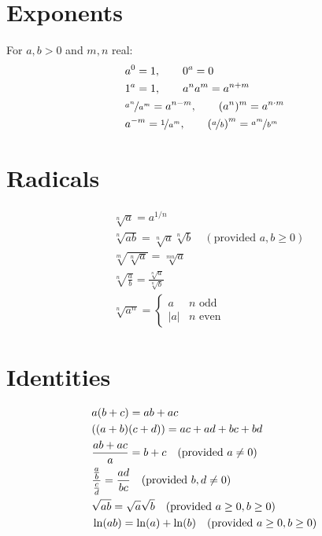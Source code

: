 \documentclass[letterpaper,landscape,9pt,fleqn]{extarticle}
\DeclarePairedDelimiter{\parens}{\lparen}{\rparen}
\begin{document}
\begin{multicols*}{3}
\section*{Exponents}
\vspace{-0.15in}
\begin{minipage}[c]{0.3333333333333\textwidth}
For \(a,b > 0\) and \(m,n\) real:
\begin{alignat*}{1}
&a^0 = 1,  \quad \quad 0^a = 0\\
&1^a = 1, \quad \quad  a^n a^m = a^{n+m}  \\
&\nicefrac{a^n}{a^m} = a^{n-m}, \quad \quad (a^n)^m = a^{n \cdot m} \\
&a^{-m} = \nicefrac{1}{a^m}, \quad \quad \left(\nicefrac{a}{b}\right)^m = \nicefrac{a^m}{b^m} 
\end{alignat*}
\end{minipage}

\section*{Radicals}
\begin{minipage}[c]{0.3333333333333\textwidth}
\begin{alignat*}{1}
&\sqrt[n]{a} = a^{1/n} \\
&\sqrt[n]{ab} = \sqrt[n]{a} \sqrt[n]{b}  \quad (\mbox{provided } a,b \geq 0) \\
&\sqrt[m]{\sqrt[n]{a}} = \sqrt[mn]{a} \\
&\sqrt[n]{\frac{a}{b}} = \frac{\sqrt[n]{a}}{\sqrt[n]{b}} \\
&\sqrt[n]{a^n} = \begin{cases} a & n \mbox{ odd} \\  |a| &  n \mbox{ even} \end{cases}
\end{alignat*}
\end{minipage}

\section*{Identities}
\begin{minipage}[c]{0.3333333333333\textwidth}
\begin{alignat*}{2}
   &a  \parens*{b + c} = a b + a c \\
   &\parens*{\parens{a +b}  \parens*{c + d}} = a c + a d + b c + bd \\
   &\frac{a b + ac}{a} = b + c  \quad (\mbox{provided } a \neq 0) \\
   &\frac{\frac{a}{b}}{\frac{c}{d}} = \frac{ad}{b c}  \quad (\mbox{provided } b,d \neq 0) \\
   &\sqrt{a b} = \sqrt{a}\sqrt{b}  \quad (\mbox{provided } a \geq 0, b \geq 0 ) \\
   &\ln(ab) = \ln(a) + \ln(b) \quad (\mbox{provided } a \geq 0, b \geq 0 ) \\
\end{alignat*}
\end{minipage}

\end{multicols*}
\end{document}
